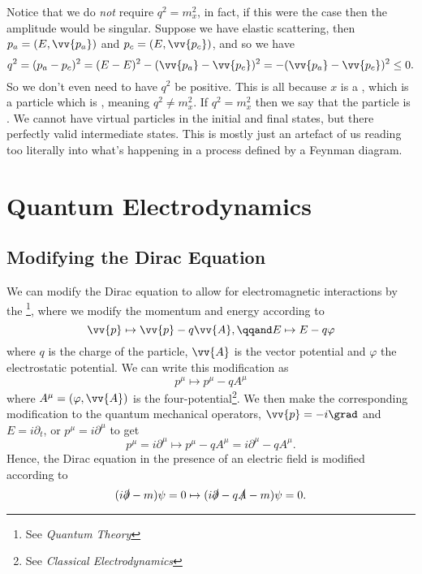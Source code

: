 \documentclass[fleqn]{NotesClass}
\newcommand{\course}[1]{\textit{#1}}
\begin{document}
    Notice that we do \emph{not} require \(q^2 = m_x^2\), in fact, if this were the case then the amplitude would be singular.
    Suppose we have elastic scattering, then \(p_a = (E, \vv{p_a})\) and \(p_c = (E, \vv{p_c})\), and so we have
    \begin{equation}
        q^2 = (p_a - p_c)^2 = (E - E)^2 - (\vv{p_a} - \vv{p_c})^2 = -(\vv{p_a} - \vv{p_c})^2 \le 0.
    \end{equation}
    So we don't even need to have \(q^2\) be positive.
    This is all because \(x\) is a , which is a particle which is , meaning \(q^2 \ne m_x^2\).
    If \(q^2 = m_x^2\) then we say that the particle is .
    We cannot have virtual particles in the initial and final states, but there perfectly valid intermediate states.
    This is mostly just an artefact of us reading too literally into what's happening in a process defined by a Feynman diagram.
    
    \chapter{Quantum Electrodynamics}
    \section{Modifying the Dirac Equation}
    We can modify the Dirac equation to allow for electromagnetic interactions by the \footnote{See \course{Quantum Theory}}, where we modify the momentum and energy according to
    \begin{equation}
        \vv{p} \mapsto \vv{p} - q\vv{A}, \qqand E \mapsto E - q\varphi
    \end{equation}
    where \(q\) is the charge of the particle, \(\vv{A}\) is the vector potential and \(\varphi\) the electrostatic potential.
    We can write this modification as
    \begin{equation}
        p^\mu \mapsto p^\mu - qA^\mu
    \end{equation}
    where \(A^\mu = (\varphi, \vv{A})\) is the four-potential\footnote{See \course{Classical Electrodynamics}}.
    We then make the corresponding modification to the quantum mechanical operators, \(\vv{p} = -i\grad\) and \(E = i\partial_t\), or \(p^\mu = i\partial^\mu\) to get
    \begin{equation}
        p^\mu = i\partial^\mu \mapsto p^\mu - qA^\mu = i\partial^\mu - qA^\mu.
    \end{equation}
    Hence, the Dirac equation in the presence of an electric field is modified according to
    \begin{equation}
        (i\slashed{\partial} - m)\psi = 0 \mapsto (i\slashed{\partial} - q\slashed{A} - m)\psi = 0.
    \end{equation}
    
\end{document}
